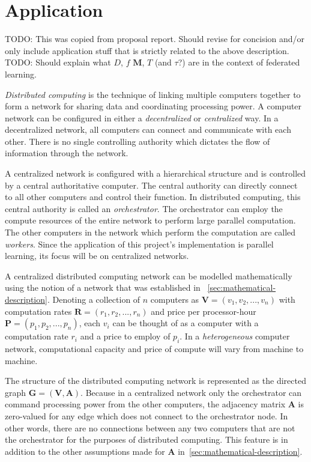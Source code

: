\documentclass[../mthe-493-final-project.tex]{subfiles}
\begin{document}

    \section{Application}
    \label{sec:Application}

    TODO: This was copied from proposal report. Should revise for concision and/or only include application stuff that is strictly related to the above description.
    TODO: Should explain what $D$, $f$ $\mathbf{M}$, $T$ (and $\tau$?) are in the context of federated learning.

    \textit{Distributed computing} is the technique of linking multiple computers together to form a network for sharing data and coordinating processing power. A computer network can be configured in either a \textit{decentralized} or \textit{centralized} way. In a decentralized network, all computers can connect and communicate with each other. There is no single controlling authority which dictates the flow of information through the network.

    A centralized network is configured with a hierarchical structure and is controlled by a central authoritative computer. The central authority can directly connect to all other computers and control their function. In distributed computing, this central authority is called an \textit{orchestrator}. The orchestrator can employ the compute resources of the entire network to perform large parallel computation. The other computers in the network which perform the computation are called \textit{workers}. Since the application of this project's implementation is parallel learning, its focus will be on centralized networks.

    A centralized distributed computing network can be modelled mathematically using the notion of a network that was established in ~\autoref{sec:mathematical-description}. Denoting a collection of $n$ computers as $\mathbf{V} = (v_1, v_2, ..., v_n)$ with computation rates $\mathbf{R} = (r_1, r_2, ..., r_n)$ and price per processor-hour $\mathbf{P} = (p_1, p_2, ..., p_n)$, each $v_i$ can be thought of as a computer with a computation rate $r_i$ and a price to employ of $p_i$. In a \textit{heterogeneous} computer network, computational capacity and price of compute will vary from machine to machine.

    The structure of the distributed computing network is represented as the directed graph $\mathbf{G} = (\mathbf{V}, \mathbf{A})$. Because in a centralized network only the orchestrator can command processing power from the other computers, the adjacency matrix $\mathbf{A}$ is zero-valued for any edge which does not connect to the orchestrator node. In other words, there are no connections between any two computers that are not the orchestrator for the purposes of distributed computing. This feature is in addition to the other assumptions made for $\mathbf{A}$ in~\autoref{sec:mathematical-description}.
\end{document}
